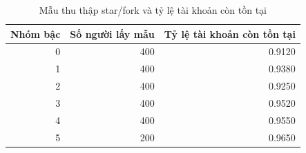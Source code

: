 \begin{table}[htbp]
\caption{Mẫu thu thập star/fork và tỷ lệ tài khoản còn tồn tại}
\label{tab:rq3_coverage}
\begin{tabular}{rrr}
\toprule
Nhóm bậc & Số người lấy mẫu & Tỷ lệ tài khoản còn tồn tại \\
\midrule
0 & 400 & 0.9120 \\
1 & 400 & 0.9380 \\
2 & 400 & 0.9250 \\
3 & 400 & 0.9520 \\
4 & 400 & 0.9550 \\
5 & 200 & 0.9650 \\
\bottomrule
\end{tabular}
\end{table}
